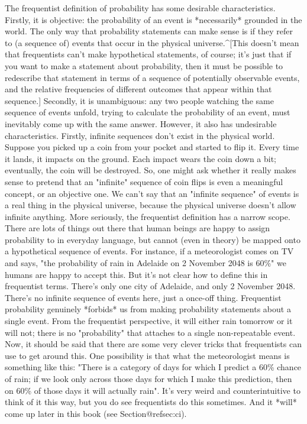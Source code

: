 The frequentist definition of probability has some desirable characteristics. Firstly, it is objective: the probability of an event is *necessarily* grounded in the world. The only way that probability statements can make sense is if they refer to (a sequence of) events that occur in the physical universe.^[This doesn't mean that frequentists can't make hypothetical statements, of course; it's just that if you want to make a statement about probability, then it must be possible to redescribe that statement in terms of a sequence of potentially observable events, and the relative frequencies of different outcomes that appear within that sequence.] Secondly, it is unambiguous: any two people watching the same sequence of events unfold, trying to calculate the probability of an event, must inevitably come up with the same answer. However, it also has undesirable characteristics. Firstly, infinite sequences don't exist in the physical world. Suppose you picked up a coin from your pocket and started to flip it. Every time it lands, it impacts on the ground. Each impact wears the coin down a bit; eventually, the coin will be destroyed. So, one might ask whether it really makes sense to pretend that an "infinite" sequence of coin flips is even a meaningful concept, or an objective one. We can't say that an "infinite sequence" of events is a real thing in the physical universe, because the physical universe doesn't allow infinite anything.  More seriously, the frequentist definition has a narrow scope. There are lots of things out there that human beings are happy to assign probability to in everyday language, but cannot (even in theory) be mapped onto a hypothetical sequence of events. For instance, if a meteorologist comes on TV and says, "the probability of rain in Adelaide on 2 November 2048 is 60\%" we humans are happy to accept this. But it's not clear how to define this in frequentist terms. There's only one city of Adelaide, and only 2 November 2048. There's no infinite sequence of events here, just a once-off thing. Frequentist probability genuinely *forbids* us from making probability statements about a single event. From the frequentist perspective, it will either rain tomorrow or it will not; there is no "probability" that attaches to a single non-repeatable event. Now, it should be said that there are some very clever tricks that frequentists can use to get around this. One possibility is that what the meteorologist means is something like this: "There is a category of days for which I predict a 60\% chance of rain; if we look only across those days for which I make this prediction, then on 60\% of those days it will actually rain". It's very weird and counterintuitive to think of it this way, but you do see frequentists do this sometimes. And it *will* come up later in this book (see Section@refsec:ci).

